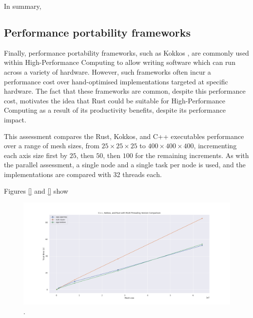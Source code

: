 
In summary,


\subsection{Performance portability frameworks}
\label{ssec:performance-portability-frameworks}

Finally, performance portability frameworks, such as Kokkos \cite{KokkosEcosystem}, are commonly used within High-Performance Computing to allow writing software which can run across a variety of hardware. However, such frameworks often incur a performance cost over hand-optimised implementations targeted at specific hardware. The fact that these frameworks are common, despite this performance cost, motivates the idea that Rust could be suitable for High-Performance Computing as a result of its productivity benefits, despite its performance impact.

This assessment compares the Rust, Kokkos, and C++ executables performance over a range of mesh sizes, from $25 \times 25 \times 25$ to $400 \times 400 \times 400$, incrementing each axis size first by $25$, then $50$, then $100$ for the remaining increments. As with the parallel assessment, a single node and a single task per node is used, and the implementations are compared with 32 threads each.

Figures \ref{} and \ref{} show 


\begin{figure}[H]
    \centering
    \includegraphics[width=\textwidth]{images/5_performance/parallelism/16_kokkos_line.png}
    \caption{.}
    \label{fig:16_kokkos_line}
\end{figure}


